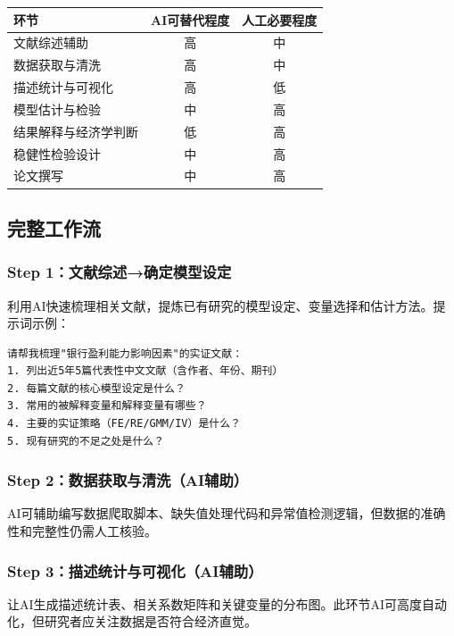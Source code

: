 \begin{table}[H]
\centering
\begin{tabular}{lcc}
\toprule
\textbf{环节} & \textbf{AI可替代程度} & \textbf{人工必要程度} \\
\midrule
文献综述辅助 & 高 & 中 \\
数据获取与清洗 & 高 & 中 \\
描述统计与可视化 & 高 & 低 \\
模型估计与检验 & 中 & 高 \\
结果解释与经济学判断 & 低 & 高 \\
稳健性检验设计 & 中 & 高 \\
论文撰写 & 中 & 高 \\
\bottomrule
\end{tabular}
\end{table}

\subsection{完整工作流}

\subsubsection{Step 1：文献综述→确定模型设定}

利用AI快速梳理相关文献，提炼已有研究的模型设定、变量选择和估计方法。提示词示例：

\begin{lstlisting}
请帮我梳理"银行盈利能力影响因素"的实证文献：
1. 列出近5年5篇代表性中文文献（含作者、年份、期刊）
2. 每篇文献的核心模型设定是什么？
3. 常用的被解释变量和解释变量有哪些？
4. 主要的实证策略（FE/RE/GMM/IV）是什么？
5. 现有研究的不足之处是什么？
\end{lstlisting}

\subsubsection{Step 2：数据获取与清洗（AI辅助）}

AI可辅助编写数据爬取脚本、缺失值处理代码和异常值检测逻辑，但数据的准确性和完整性仍需人工核验。

\subsubsection{Step 3：描述统计与可视化（AI辅助）}

让AI生成描述统计表、相关系数矩阵和关键变量的分布图。此环节AI可高度自动化，但研究者应关注数据是否符合经济直觉。

